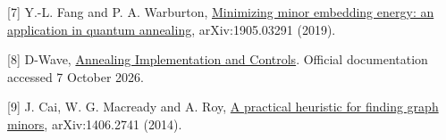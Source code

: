 \documentclass[11pt,letterpaper]{article}
\begin{document}
{\small [7] Y.-L. Fang and P. A. Warburton, \href{https://arxiv.org/abs/1905.03291}{Minimizing minor embedding energy: an application in quantum annealing}, arXiv:1905.03291 (2019).\par}\vspace{5pt}

{\small [8] D-Wave, \href{https://docs.dwavequantum.com/en/latest/quantum_research/annealing.html}{Annealing Implementation and Controls}. Official documentation accessed 7 October 2026.\par}\vspace{5pt}

{\small [9] J. Cai, W. G. Macready and A. Roy, \href{https://arxiv.org/abs/1406.2741}{A practical heuristic for finding graph minors}, arXiv:1406.2741 (2014).
\par}\vspace{5pt}
\end{document}

